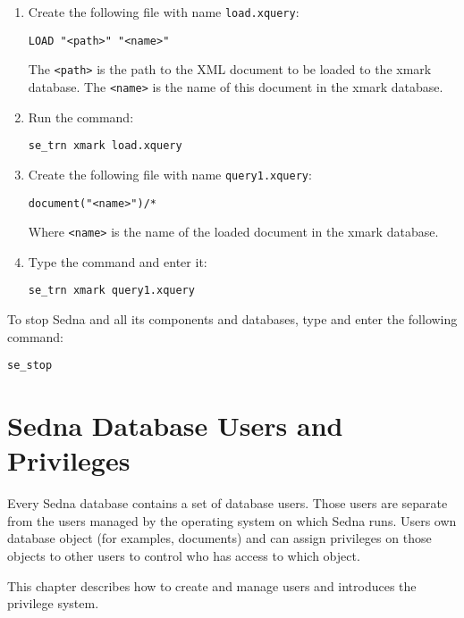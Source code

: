 \documentclass[a4paper,12pt]{article}
\begin{document}
\begin{enumerate}
\item Create the following file with name \verb!load.xquery!:

\begin{verbatim}
LOAD "<path>" "<name>"
\end{verbatim}

The \verb!<path>! is the path to the XML document to be loaded to the xmark database. The \verb!<name>! is the name of this document in the xmark database.

\item Run the command: 

\begin{verbatim}
se_trn xmark load.xquery
\end{verbatim}

\item Create the following file with name \verb!query1.xquery!:

\begin{verbatim}
document("<name>")/*
\end{verbatim}

Where \verb!<name>! is the name of the loaded document in the xmark database.

\item Type the command and enter it:
\begin{verbatim}
se_trn xmark query1.xquery
\end{verbatim}
\end{enumerate}

To stop Sedna and all its components and databases, type and enter the following command:

\begin{verbatim}
se_stop
\end{verbatim}

\section{Sedna Database Users and Privileges}

Every Sedna database contains a set of database users. Those users are separate from the users managed by the operating system on which Sedna runs. Users own database object (for examples, documents) and can assign privileges on those objects to other users to control who has access to which object. 

This chapter describes how to create and manage users and introduces the privilege system.
\end{document}
